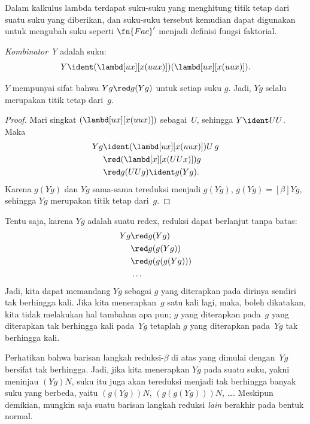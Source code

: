 \documentclass[../../../include/open-logic-section]{subfiles}
\begin{document}
Dalam kalkulus lambda terdapat suku-suku yang menghitung titik tetap dari suatu
suku yang diberikan, dan suku-suku tersebut kemudian dapat digunakan untuk
mengubah suku seperti $\fn{Fac}'$ menjadi definisi fungsi faktorial.

\begin{defn}

  \emph{Kombinator Y} adalah suku:
  \[
  Y \ident (\lambd[ux][x(uux)])(\lambd[ux][x(uux)]).
  \]
\end{defn}

\begin{thm}
  $Y$ mempunyai sifat bahwa $Yg \red g(Yg)$ untuk setiap suku $g$. Jadi,
  $Yg$ selalu merupakan titik tetap dari~$g$.
\end{thm}

\begin{proof}
  Mari singkat $(\lambd[ux][x(uux)])$ sebagai~$U$, sehingga $Y \ident UU$.
  Maka
  \begin{align*}
    Y g &\ident (\lambd[ux][x(uux)])U\,g \\
    &\red (\lambd[x][x(UUx)])g\\
    & \red g(UUg) \ident g(Yg).
  \end{align*}
  Karena $g(Yg)$ dan $Yg$ sama-sama tereduksi menjadi $g(Yg)$,
  $g(Yg) \equal[\beta] Yg$, sehingga $Yg$ merupakan titik tetap dari~$g$.
\end{proof}

Tentu saja, karena $Yg$ adalah suatu redex, reduksi dapat berlanjut tanpa
batas:
\begin{align*}
  Y g &\red g (Y g) \\
    &\red g (g (Y g)) \\
    &\red g(g (g (Y g)))\\
    &\ldots
\end{align*}
Jadi, kita dapat memandang $Yg$ sebagai $g$ yang diterapkan pada dirinya
sendiri tak berhingga kali. Jika kita menerapkan~$g$ satu kali lagi, maka,
boleh dikatakan, kita tidak melakukan hal tambahan apa pun; $g$ yang
diterapkan pada~$g$ yang diterapkan tak berhingga kali pada~$Yg$ tetaplah
$g$ yang diterapkan pada~$Yg$ tak berhingga kali.

Perhatikan bahwa barisan langkah reduksi-$\beta$ di atas yang dimulai
dengan~$Yg$ bersifat tak berhingga. Jadi, jika kita menerapkan $Yg$ pada suatu
suku, yakni meninjau $(Yg)N$, suku itu juga akan tereduksi menjadi tak
berhingga banyak suku yang berbeda, yaitu $(g(Yg))N$, $(g(g(Yg)))N$, \dots.
Meskipun demikian, mungkin saja suatu barisan langkah reduksi \emph{lain}
berakhir pada bentuk normal.
\end{document}
